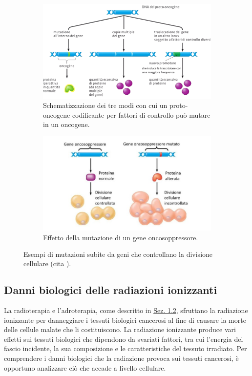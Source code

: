 \documentclass[12pt,a4paper,twoside]{report}
\begin{document}
	\begin{figure}[H]
		\centering
		\begin{subfigure}[b]{0.9\textwidth}
			\centering
			\includegraphics[width=\textwidth, scale=0.5]{oncogene.png}
			\caption{Schematizzazione dei tre modi con cui un proto-oncogene codificante per fattori di controllo può mutare in un oncogene.}
			\label{fig:oncogene}
		\end{subfigure}
		\par
		\begin{subfigure}[b]{0.9\textwidth}
			\centering
			\includegraphics[width=\textwidth, scale=0.5]{oncosoppressore.jpg}
			\caption{Effetto della mutazione di un gene oncosoppressore.}
			\label{fig:oncosoppressore}
		\end{subfigure}
		\caption{Esempi di mutazioni subite da geni che controllano la divisione cellulare (cita
			).}
		\label{fig:mutazioni_genetiche}
	\end{figure}
	
	\subsection{Danni biologici delle radiazioni ionizzanti}
	La radioterapia e l'adroterapia, come descritto in \hyperref[sec:1.2]{Sez. 1.2}, sfruttano la radiazione ionizzante per danneggiare i tessuti biologici cancerosi al fine di causare la morte delle cellule malate che li costituiscono. La radiazione ionizzante produce vari effetti sui tessuti biologici che dipendono da svariati fattori, tra cui l'energia del fascio incidente, la sua composizione e le caratteristiche del tessuto irradiato. Per comprendere i danni biologici che la radiazione provoca sui tessuti cancerosi, è opportuno analizzare ciò che accade a livello cellulare.
	
\end{document}

